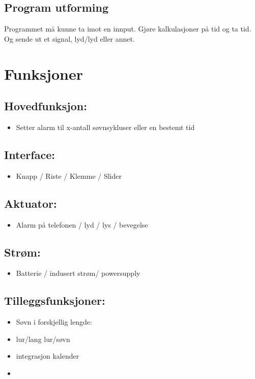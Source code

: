 \documentclass[12pt, a4paper]{article}
\begin{document}
\subsection*{Program utforming}
Programmet må kunne ta imot en innput. Gjøre kalkulasjoner på tid og ta tid. 
Og sende ut et signal, lyd/lyd eller annet. 

\section{Funksjoner}

\subsection {Hovedfunksjon:}
\begin{itemize}
    \item Setter alarm til x-antall søvnsykluser eller en bestemt tid
\end{itemize}


\subsection {Interface: }
\begin{itemize}
    \item Knapp / Riste / Klemme / Slider
\end{itemize}


\subsection {Aktuator:}
\begin{itemize}
    \item Alarm på telefonen / lyd / lys / bevegelse
\end{itemize}


\subsection {Strøm: }
\begin{itemize}
    \item Batterie / indusert strøm/ powersupply
\end{itemize}



\subsection {Tilleggsfunksjoner: }
\begin{itemize}
    \item Søvn i forskjellig lengde: 
    \item lur/lang lur/søvn
    \item integrasjon kalender
    \item 
\end{itemize}
\end{document}
